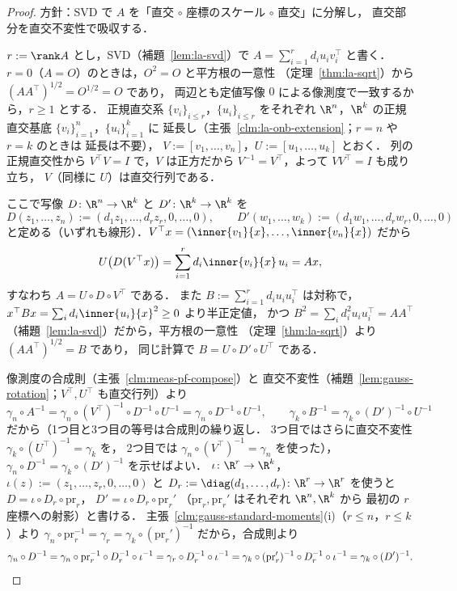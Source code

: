 \begin{proof}
  方針：SVD で $A$ を「直交 $\circ$ 座標のスケール $\circ$ 直交」に分解し，
  直交部分を直交不変性で吸収する．

  $r:=\rank A$ とし，SVD（補題~\ref{lem:la-svd}）で
  $A=\sum_{i=1}^rd_iu_iv_i^\top$ と書く．
  $r=0$（$A=O$）のときは，$O^2=O$ と平方根の一意性
  （定理~\ref{thm:la-sqrt}）から $(AA^\top)^{1/2}=O^{1/2}=O$ であり，
  両辺とも定値写像 $0$ による像測度で一致するから，$r\geq1$ とする．
  正規直交系 $\{v_i\}_{i\leq r}$，$\{u_i\}_{i\leq r}$ をそれぞれ
  $\R^n$，$\R^k$ の正規直交基底 $\{v_i\}_{i=1}^n$，$\{u_i\}_{i=1}^k$ に
  延長し（主張~\ref{clm:la-onb-extension}；$r=n$ や $r=k$ のときは
  延長は不要），
  $V:=[v_1,\dots,v_n]$，$U:=[u_1,\dots,u_k]$ とおく．
  列の正規直交性から $V^\top V=I$ で，$V$ は正方だから
  $V^{-1}=V^\top$，よって $VV^\top=I$ も成り立ち，
  $V$（同様に $U$）は直交行列である．

  ここで写像 $D\colon\R^n\to\R^k$ と $D'\colon\R^k\to\R^k$ を
  \[
    D(z_1,\dots,z_n):=(d_1z_1,\dots,d_rz_r,0,\dots,0),
    \qquad
    D'(w_1,\dots,w_k):=(d_1w_1,\dots,d_rw_r,0,\dots,0)
  \]
  と定める（いずれも線形）．$V^\top x=(\inner{v_1}{x},\dots,\inner{v_n}{x})$ だから
  \[
    U\bigl(D(V^\top x)\bigr)
    =\sum_{i=1}^rd_i\inner{v_i}{x}\,u_i
    =Ax,
  \]
  すなわち $A=U\circ D\circ V^\top$ である．
  また $B:=\sum_{i=1}^rd_iu_iu_i^\top$ は対称で，
  $x^\top Bx=\sum_id_i\inner{u_i}{x}^2\geq0$ より半正定値，
  かつ $B^2=\sum_id_i^2u_iu_i^\top=AA^\top$
  （補題~\ref{lem:la-svd}）だから，平方根の一意性
  （定理~\ref{thm:la-sqrt}）より $(AA^\top)^{1/2}=B$ であり，
  同じ計算で $B=U\circ D'\circ U^\top$ である．

  像測度の合成則（主張~\ref{clm:meas-pf-compose}）と
  直交不変性（補題~\ref{lem:gauss-rotation}；$V^\top,U^\top$ も直交行列）より
  \[
    \gamma_n\circ A^{-1}
    =\gamma_n\circ(V^\top)^{-1}\circ D^{-1}\circ U^{-1}
    =\gamma_n\circ D^{-1}\circ U^{-1},
    \qquad
    \gamma_k\circ B^{-1}
    =\gamma_k\circ(D')^{-1}\circ U^{-1}
  \]
  だから（1つ目と3つ目の等号は合成則の繰り返し．
  3つ目ではさらに直交不変性 $\gamma_k\circ(U^\top)^{-1}=\gamma_k$ を，
  2つ目では $\gamma_n\circ(V^\top)^{-1}=\gamma_n$ を使った），
  $\gamma_n\circ D^{-1}=\gamma_k\circ(D')^{-1}$ を示せばよい．
  $\iota\colon\R^r\to\R^k$，$\iota(z):=(z_1,\dots,z_r,0,\dots,0)$ と
  $D_r:=\diag(d_1,\dots,d_r)\colon\R^r\to\R^r$ を使うと
  $D=\iota\circ D_r\circ\mathrm{pr}_r$，
  $D'=\iota\circ D_r\circ\mathrm{pr}_r'$
  （$\mathrm{pr}_r,\mathrm{pr}_r'$ はそれぞれ $\R^n,\R^k$ から
  最初の $r$ 座標への射影）と書ける．
  主張~\ref{clm:gauss-standard-moments}(i)（$r\leq n$，$r\leq k$）より
  $\gamma_n\circ\mathrm{pr}_r^{-1}=\gamma_r=\gamma_k\circ(\mathrm{pr}_r')^{-1}$
  だから，合成則より
  \[
    \gamma_n\circ D^{-1}
    =\gamma_n\circ\mathrm{pr}_r^{-1}\circ D_r^{-1}\circ\iota^{-1}
    =\gamma_r\circ D_r^{-1}\circ\iota^{-1}
    =\gamma_k\circ(\mathrm{pr}_r')^{-1}\circ D_r^{-1}\circ\iota^{-1}
    =\gamma_k\circ(D')^{-1}.  \qedhere
  \]
\end{proof}


